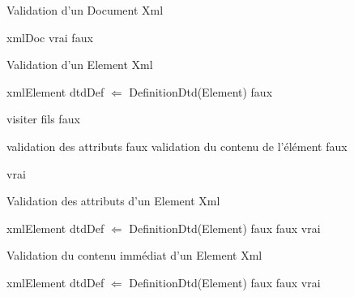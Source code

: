 \begin{algorithm}
\caption{Validation d'un Document Xml}
\label{ValidateXmlDoc}
\begin{algorithmic}
\REQUIRE xmlDoc 
       \RETURN vrai
\ELSE
        \RETURN faux
\ENDIF 
\end{algorithmic}
\end{algorithm}
\begin{algorithm}
\caption{Validation d'un Element Xml}
\label{ValidateXmlElement}
\begin{algorithmic}
\REQUIRE xmlElement 
\STATE dtdDef $\Leftarrow$ DefinitionDtd(Element)
       \RETURN faux
\ELSE

		\STATE visiter fils
			\RETURN faux
		\ENDIF
	\ENDFOR
	
	\STATE validation des attributs
		\RETURN faux
	\ENDIF
	\STATE validation du contenu de l'élément
		\RETURN faux
	\ENDIF

        \RETURN vrai
\ENDIF 
\end{algorithmic}
\end{algorithm}
\begin{algorithm}
\caption{Validation des attributs d'un Element Xml}
\label{CheckAttributes}
\begin{algorithmic}
\REQUIRE xmlElement 
\STATE dtdDef $\Leftarrow$ DefinitionDtd(Element)
       \RETURN faux
\ELSE
			\RETURN faux
		\ENDIF
	\ENDFOR
	\RETURN vrai
\ENDIF 
\end{algorithmic}
\end{algorithm}
\begin{algorithm}
\caption{Validation du contenu immédiat d'un Element Xml}
\label{CheckContent}
\begin{algorithmic}
\REQUIRE xmlElement 
\STATE dtdDef $\Leftarrow$ DefinitionDtd(Element)
       \RETURN faux
\ELSE
			\RETURN faux
		\ENDIF
	\ENDFOR
	\RETURN vrai
\ENDIF 
\end{algorithmic}
\end{algorithm}
